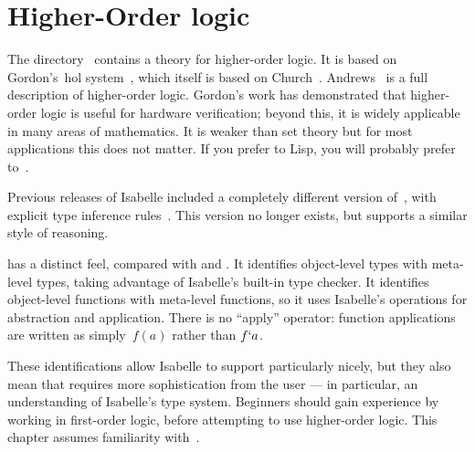 \chapter{Higher-Order logic}
The directory~ contains a theory for higher-order logic.
It is based on Gordon's~{\sc hol} system~\cite{mgordon88a}, which itself is
based on Church~\cite{church40}.  Andrews~\cite{andrews86} is a full
description of higher-order logic.  Gordon's work has demonstrated that
higher-order logic is useful for hardware verification; beyond this, it is
widely applicable in many areas of mathematics.  It is weaker than {\ZF}
set theory but for most applications this does not matter.  If you prefer
{\ML} to Lisp, you will probably prefer {\HOL} to~{\ZF}.

Previous releases of Isabelle included a completely different version
of~{\HOL}, with explicit type inference rules~\cite{paulson-COLOG}.  This
version no longer exists, but  supports a similar style of
reasoning.

{\HOL} has a distinct feel, compared with {\ZF} and {\CTT}.  It
identifies object-level types with meta-level types, taking advantage of
Isabelle's built-in type checker.  It identifies object-level functions
with meta-level functions, so it uses Isabelle's operations for abstraction
and application.  There is no ``apply'' operator: function applications are
written as simply~$f(a)$ rather than $f{\tt`}a$.

These identifications allow Isabelle to support {\HOL} particularly nicely,
but they also mean that {\HOL} requires more sophistication from the user
--- in particular, an understanding of Isabelle's type system.  Beginners
should gain experience by working in first-order logic, before attempting
to use higher-order logic.  This chapter assumes familiarity with~{\FOL{}}.


